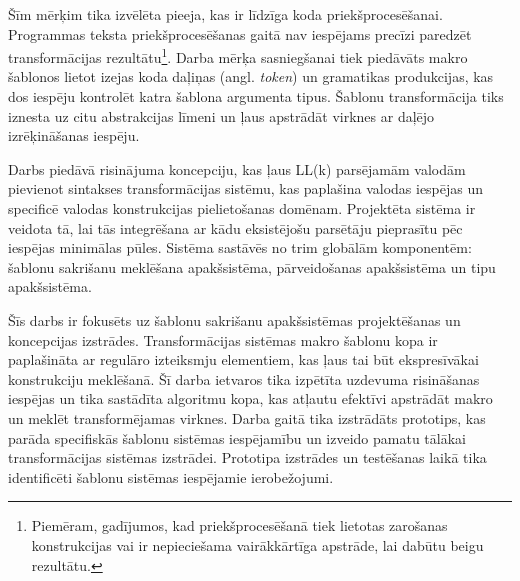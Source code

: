Šīm mērķim tika izvēlēta pieeja, kas ir līdzīga koda priekšprocesēšanai. Programmas teksta priekšprocesēšanas gaitā nav iespējams precīzi paredzēt transformācijas rezultātu\footnote{Piemēram, gadījumos, kad priekšprocesēšanā tiek lietotas zarošanas konstrukcijas vai ir nepieciešama vairākkārtīga apstrāde, lai dabūtu beigu rezultātu.}. Darba mērķa sasniegšanai tiek piedāvāts makro šablonos lietot izejas koda daļiņas (angl. \emph{token}) un gramatikas produkcijas, kas dos iespēju kontrolēt katra šablona argumenta tipus. Šablonu transformācija tiks iznesta uz citu abstrakcijas līmeni un ļaus apstrādāt virknes ar daļējo izrēķināšanas iespēju.

Darbs piedāvā risinājuma koncepciju, kas ļaus LL(k) parsējamām valodām pievienot sintakses transformācijas sistēmu, kas paplašina valodas iespējas un specificē valodas konstrukcijas pielietošanas domēnam. Projektēta sistēma ir veidota tā, lai tās integrēšana ar kādu eksistējošu parsētāju pieprasītu pēc iespējas minimālas pūles. Sistēma sastāvēs no trim globālām komponentēm: šablonu sakrišanu meklēšana apakšsistēma, pārveidošanas apakšsistēma un tipu apakšsistēma. %

Šīs darbs ir fokusēts uz šablonu sakrišanu apakšsistēmas projektēšanas un koncepcijas izstrādes. Transformācijas sistēmas makro šablonu kopa ir paplašināta ar regulāro izteiksmju elementiem, kas ļaus tai būt ekspresīvākai konstrukciju meklēšanā. Šī darba ietvaros tika izpētīta uzdevuma risināšanas iespējas un tika sastādīta algoritmu kopa, kas atļautu efektīvi apstrādāt makro un meklēt transformējamas virknes. Darba gaitā tika izstrādāts prototips, kas parāda specifiskās šablonu sistēmas iespējamību un izveido pamatu tālākai transformācijas sistēmas izstrādei. Prototipa izstrādes un testēšanas laikā tika identificēti šablonu sistēmas iespējamie ierobežojumi.


